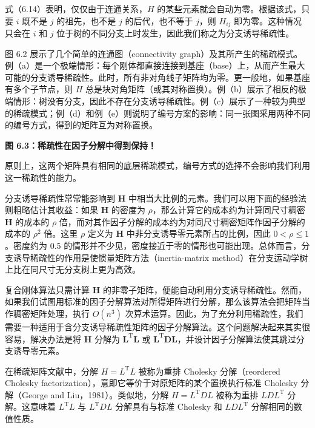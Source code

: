 \documentclass[10pt,a4paper]{book}
\theoremstyle{thmstyle} %
\theoremstyle{defstyle} %
\theoremstyle{prostyle} %
\begin{document}
式（6.14）表明，仅仅由于连通关系，$H$ 的某些元素就会自动为零。根据该式，只要 $i$ 既不是 $j$ 的祖先，也不是 $j$ 的后代，也不等于 $j$，则 $H_{ij}$ 即为零。这种情况只会在 $i$ 和 $j$ 位于树的不同分支上时发生，因此我们称之为分支诱导稀疏性。



图 6.2 展示了几个简单的连通图（connectivity graph）及其所产生的稀疏模式。例（a）是一个极端情形：每个刚体都直接连接到基座（base）上，从而产生最大可能的分支诱导稀疏性。此时，所有非对角线子矩阵均为零。更一般地，如果基座有多个子节点，则 $H$ 总是块对角矩阵（或其对称置换）。例（b）展示了相反的极端情形：树没有分支，因此不存在分支诱导稀疏性。例（c）展示了一种较为典型的稀疏模式；例（d）和例（e）则说明了编号方案的影响：同一张图采用两种不同的编号方式，得到的矩阵互为对称置换。



\noindent\textbf{图 6.3：稀疏性在因子分解中得到保持！}





原则上，这两个矩阵具有相同的底层稀疏模式，编号方式的选择不会影响我们利用这一稀疏性的能力。



分支诱导稀疏性常常能影响到 $\mathbf{H}$ 中相当大比例的元素。我们可以用下面的经验法则粗略估计其收益：如果 $\mathbf{H}$ 的密度为 $\rho$，那么计算它的成本约为计算同尺寸稠密 $\mathbf{H}$ 的成本的 $\rho$ 倍，而对其作因子分解的成本约为对同尺寸稠密矩阵作因子分解的成本的 $\rho^2$ 倍。这里 $\rho$ 定义为 $\mathbf{H}$ 中非分支诱导零元素所占的比例，因此 $0 < \rho \leq 1$。密度约为 0.5 的情形并不少见，密度接近于零的情形也可能出现。总体而言，分支诱导稀疏性的作用是使惯量矩阵方法（inertia-matrix method）在分支运动学树上比在同尺寸无分支树上更为高效。



复合刚体算法只需计算 $\mathbf{H}$ 的非零子矩阵，便能自动利用分支诱导稀疏性。然而，如果我们试图用标准的因子分解算法对所得矩阵进行分解，那么该算法会把矩阵当作稠密矩阵处理，执行 $O(n^3)$ 次算术运算。因此，为了充分利用稀疏性，我们需要一种适用于含分支诱导稀疏性矩阵的因子分解算法。这个问题解决起来其实很容易，解决办法是将 $\mathbf{H}$ 分解为 $\mathbf{L}^\text{T}\mathbf{L}$ 或 $\mathbf{L}^\text{T}\mathbf{D}\mathbf{L}$，并设计因子分解算法使其跳过分支诱导零元素。



在稀疏矩阵文献中，分解 $H = L^{\mathrm{T}}L$ 被称为重排 Cholesky 分解（reordered Cholesky factorization），意即它等价于对原矩阵的某个置换执行标准 Cholesky 分解（George and Liu，1981）。类似地，分解 $H = L^{\mathrm{T}}DL$ 被称为重排 $LDL^{\mathrm{T}}$ 分解。这意味着 $L^{\mathrm{T}}L$ 与 $L^{\mathrm{T}}DL$ 分解具有与标准 Cholesky 和 $LDL^{\mathrm{T}}$ 分解相同的数值性质。
\end{document}
